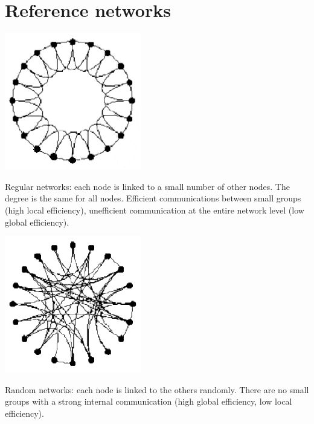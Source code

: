 \documentclass[12pt]{article}
\begin{document}
\newpage

\section{Reference networks}

\vspace{20px}

\noindent
\begin{minipage}{0.3\textwidth}
	\includegraphics[scale=0.6]{images/regular_network.png}
\end{minipage}\hfill
\begin{minipage}{0.6\textwidth}
    Regular networks: each node is linked to a small number of other nodes. The degree is the same for all nodes. Efficient communications between small groups (high local efficiency), unefficient communication at the entire network level (low global efficiency).
\end{minipage}

\vspace{20px}

\noindent
\begin{minipage}{0.3\textwidth}
	\includegraphics[scale=0.6]{images/random_network.png} 
\end{minipage}\hfill
\begin{minipage}{0.6\textwidth}
	Random networks: each node is linked to the others randomly. There are no small groups with a strong internal communication (high global efficiency, low local efficiency).
\end{minipage}
\end{document}
